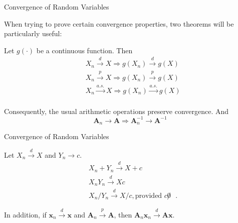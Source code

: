 \documentclass[11pt, xcolor={dvipsnames}, hyperref={colorlinks, allcolors=Blue}]{beamer}
\renewcommand{\implies}{\Rightarrow}
\begin{document}
\begin{frame}{Convergence of Random Variables}

When trying to prove certain convergence properties, two theorems will be particularly useful:\bigskip

\begin{theorem}
Let $g(\cdot)$ be a continuous function. Then 
\begin{align*}
& X_{n} \overset{d}{\to} X \implies g(X_{n}) \overset{d}{\to} g(X)\\	
& X_{n} \overset{p}{\to} X \implies g(X_{n}) \overset{p}{\to} g(X)\\	
& X_{n} \overset{a.s.}{\to} X \implies g(X_{n}) \overset{a.s.}{\to} g(X)\\	
\end{align*}
\end{theorem}

Consequently, the usual arithmetic operations preserve convergence. And 
\[\mathbf{A}_{n} \to \mathbf{A} \implies \mathbf{A}_{n}^{-1} \to \mathbf{A}^{-1}\]
\end{frame}
\begin{frame}{Convergence of Random Variables}

\begin{theorem}
Let $X_{n} \overset{d}{\to} X$ and $Y_{n} \to c$.
\begin{align*}
&X_{n} + Y_{n} \overset{d}{\to} X + c\\
& X_{n}Y_{n} \overset{d}{\to} Xc\\
& X_{n}/Y_{n} \overset{d}{\to} X / c, \text{provided $c \not 0$ }.
\end{align*}
\end{theorem}

In addition, if $\mathbf{x}_{n} \overset{d}{\to} \mathbf{x}$ and $\mathbf{A}_{n} \overset{p}{\to} \mathbf{A}$, then $\mathbf{A}_{n}\mathbf{x}_{n} \overset{d}{\to} \mathbf{A}\mathbf{x}$.
\end{frame}
\end{document}
